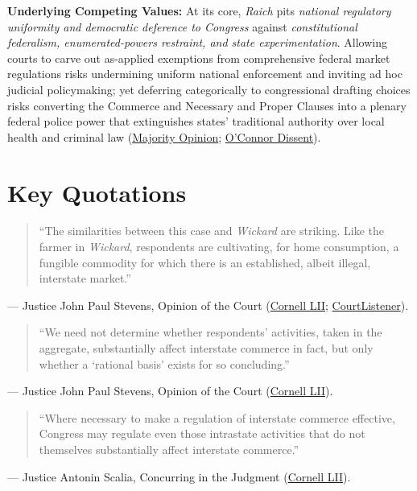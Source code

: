 \documentclass[12pt]{article}
\begin{document}
\textbf{Underlying Competing Values:} At its core, \textit{Raich} pits \textit{national regulatory uniformity and democratic deference to Congress} against \textit{constitutional federalism, enumerated-powers restraint, and state experimentation}. Allowing courts to carve out as-applied exemptions from comprehensive federal market regulations risks undermining uniform national enforcement and inviting ad hoc judicial policymaking; yet deferring categorically to congressional drafting choices risks converting the Commerce and Necessary and Proper Clauses into a plenary federal police power that extinguishes states' traditional authority over local health and criminal law (\href{https://www.law.cornell.edu/supct/html/03-1454.ZO.html}{Majority Opinion}; \href{https://www.law.cornell.edu/supct/html/03-1454.ZD.html}{O'Connor Dissent}).

\section{Key Quotations}

\begin{quote}
``The similarities between this case and \textit{Wickard} are striking. Like the farmer in \textit{Wickard}, respondents are cultivating, for home consumption, a fungible commodity for which there is an established, albeit illegal, interstate market.''
\end{quote}
\noindent --- Justice John Paul Stevens, Opinion of the Court (\href{https://www.law.cornell.edu/supct/html/03-1454.ZO.html}{Cornell LII}; \href{https://www.courtlistener.com/opinion/799995/gonzales-v-raich/}{CourtListener}).

\begin{quote}
``We need not determine whether respondents' activities, taken in the aggregate, substantially affect interstate commerce in fact, but only whether a `rational basis' exists for so concluding.''
\end{quote}
\noindent --- Justice John Paul Stevens, Opinion of the Court (\href{https://www.law.cornell.edu/supct/html/03-1454.ZO.html}{Cornell LII}).

\begin{quote}
``Where necessary to make a regulation of interstate commerce effective, Congress may regulate even those intrastate activities that do not themselves substantially affect interstate commerce.''
\end{quote}
\noindent --- Justice Antonin Scalia, Concurring in the Judgment (\href{https://www.law.cornell.edu/supct/html/03-1454.ZC.html}{Cornell LII}).
\end{document}

